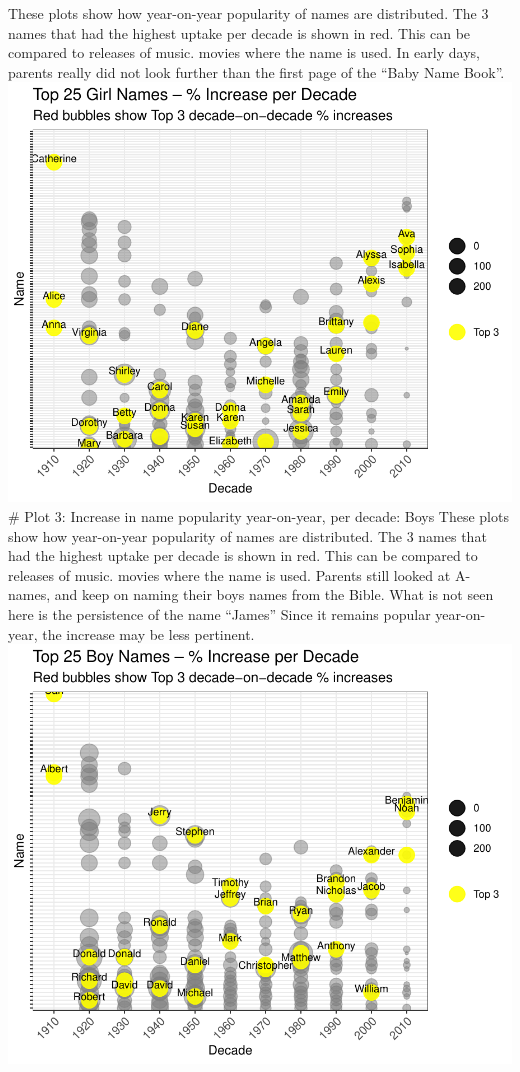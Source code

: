 \documentclass[11pt,preprint]{elsarticle}
\numberwithin{equation}{section}
\numberwithin{figure}{section}
\numberwithin{table}{section}
\begin{document}
These plots show how year-on-year popularity of names are distributed.
The 3 names that had the highest uptake per decade is shown in red. This
can be compared to releases of music. movies where the name is used. In
early days, parents really did not look further than the first page of
the ``Baby Name Book''.
\includegraphics{Question1_files/figure-latex/unnamed-chunk-2-1.pdf}
\newpage \# Plot 3: Increase in name popularity year-on-year, per
decade: Boys These plots show how year-on-year popularity of names are
distributed. The 3 names that had the highest uptake per decade is shown
in red. This can be compared to releases of music. movies where the name
is used. Parents still looked at A-names, and keep on naming their boys
names from the Bible. What is not seen here is the persistence of the
name ``James'' Since it remains popular year-on-year, the increase may
be less pertinent.
\includegraphics{Question1_files/figure-latex/unnamed-chunk-3-1.pdf}
\end{document}
